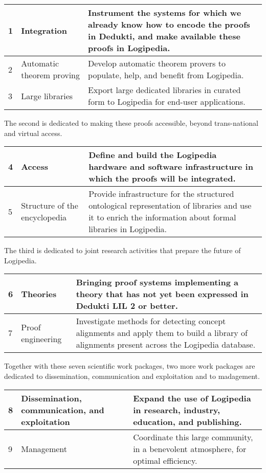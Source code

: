\begin{longtable}{|p{}|p{}|p{}|}
\hline
1
&
Integration
&
Instrument the systems for which we already know how to encode the
proofs in Dedukti, and make available these proofs in Logipedia.
\\
\hline
2
&
Automatic theorem proving
& 
Develop automatic theorem provers to populate,
help, and benefit from Logipedia.
\\
\hline
3
&
Large libraries
&
Export large dedicated libraries in curated form 
to Logipedia for end-user applications.
\\
\hline
\end{longtable}
The second is dedicated to making these proofs accessible, beyond
trans-national and virtual access.
\begin{longtable}{|p{}|p{}|p{}|}
\hline
4
&
Access
&
Define and build the Logipedia hardware and software infrastructure in
which the proofs will be integrated.
\\
\hline
5
&
Structure of the encyclopedia
&
Provide infrastructure for the structured ontological representation
of libraries and use it to enrich the information about formal
libraries in Logipedia.
\\
\hline
\end{longtable}
The third is dedicated to joint research activities that prepare
the future of Logipedia. 
\begin{longtable}{|p{}|p{}|p{}|}
\hline
6
&
Theories
&
Bringing proof systems implementing a theory 
that has not yet been expressed in Dedukti LIL 2 or better.
\\
\hline
7&Proof engineering &
Investigate methods for detecting concept alignments and apply
them to build a library of alignments present across the Logipedia database.
\\
\hline
\end{longtable}
Together with these seven scientific work packages, 
two more work packages are dedicated to dissemination, communication and
exploitation and to madagement.
\begin{longtable}{|p{}|p{}|p{}|}
\hline
8
&
Dissemination, communication, and exploitation
&
Expand the use of Logipedia in research, industry, education, and publishing.
\\
\hline
9
&
Management
&
Coordinate this large community, in a benevolent atmosphere, for optimal
efficiency.
\\
\hline
\end{longtable}

